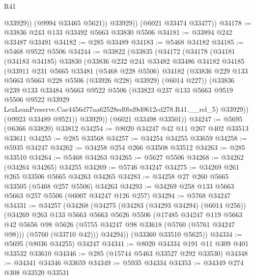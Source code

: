 \begin{lexlean}{R41}
\begin{coremodule}
                @33929))
            (@9994 @33465 @5621))
          @33929))
      (@6021 @33474 @33477))
@34178 := @33836 @243 @133 @33492 @5663 @33830 @5506
@34181 := @33894 @242 @33487 @33491
@34182 := @285 @33489
@34183 := @5468 @34182
@34185 := @5468 @9522 @5506
@34244 := @33822
    (@33835
      (@34172
        (@34178
          (@34181
            (@34183 @34185)
            @33830
            (@33836
              @232
              @241
              @33482
              @33486
              @34182
              @34185
              (@33911
                @231
                @5665
                @33481
                (@5468 @228 @5506)
                @34182
                (@33836 @229 @133 @5663 @5663 @228 @5506 (@33926 @228) @33929)
                (@6014 @227))
              (@33836
                @239
                @133
                @33484
                @5663
                @9522
                @5506
                (@33823
                  @237
                  @133
                  @5663
                  @9519
                  @5506
                  @9522
                  @33929
                  LexLeanPreserve.Cae4456d77aa62528ed0bd9d0612cd278.R41.__rel_5)
                @33929))
            (@9923 @33489 @9521))
          @33929))
      (@6021 @33498 @33501))
@34247 := @5695 (@6366 @33820) @33812
@34254 := @8020 @34247 @42 @11 @267 @402 @33513 @33611
@34255 := @285 @33568
@34257 := @34254 @34255 @33659
@34258 := @5935 @34247
@34262 := @34258 @254 @266 @33508 @33512
@34263 := @285 @33510
@34264 := @5468 @34263
@34265 := @5627 @5506
@34268 := @34262 (@34264 @34265) @34255
@34269 := @5746 @34247
@34275 := @34269 @261 @265 @33506 @5665 @34263 @34265
@34283 := @34258 @27 @260 @5665 @33505 (@5468 @257 @5506) @34263
@34293 := @34269 @258 @133 @5663 @5663 @257 @5506 (@6007 @34247 @126 @257)
@34294 := @5768 @34247
@34331 := @34257
    (@34268
      (@34275
        (@34283 (@34293 @34294) (@6014 @256))
        (@34269
          @263
          @133
          @5663
          @5663
          @5626
          @5506
          (@17485
            @34247
            @119
            @5663
            @42
            @5656
            @98
            @5626
            (@5755 @34247 @98 @33618 (@5760 (@5761 @34247 @98)))
            (@5760 (@33710 @42)))
          @34294))
      (@33360 @33510 @5625))
@34334 := @5695 (@8036 @34255) @34247
@34341 := @8020 @34334 @191 @11 @309 @401 @33532 @33610
@34346 := @285 (@15744 @5463 @33527 @292 @33530)
@34348 := @34341 @34346 @33659
@34349 := @5935 @34334
@34353 := @34349 @274 @308 @33520 @33531

\end{coremodule}
\end{lexlean}
